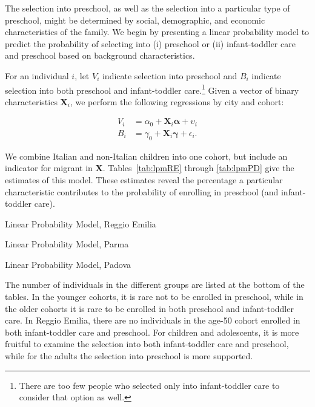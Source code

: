 The selection into preschool, as well as the selection into a particular type of preschool, might be determined by social, demographic, and economic characteristics of the family. We begin by presenting a linear probability model to predict the probability of selecting into (i) preschool or (ii) infant-toddler care and preschool based on background characteristics.

For an individual $i$, let $V_i$ indicate selection into preschool and $B_i$ indicate selection into both preschool and infant-toddler care.\footnote{There are too few people who selected only into infant-toddler care to consider that option as well.} Given a vector of binary characteristics $\mathbf{X}_i$, we perform the following regressions by city and cohort:

\begin{align}
	V_i &= \alpha_0 + \mathbf{X}_i\bm{\alpha} + \upsilon_i \label{eq:lpm-v} \\
	B_i &= \gamma_0 + \mathbf{X}_i\bm{\gamma} + \epsilon_i. \label{eq:lpm-b}
\end{align}

We combine Italian and non-Italian children into one cohort, but include an indicator for migrant in $\mathbf{X}$. Tables~\ref{tab:lpmRE} through \ref{tab:lpmPD} give the estimates of this model. These estimates reveal the percentage a particular characteristic contributes to the probability of enrolling in preschool (and infant-toddler care). 

\begin{table}
	\caption{Linear Probability Model, Reggio Emilia}\label{tab:lpmRE}
	\centering
	\footnotesize
		
\end{table}

\begin{table}
	\caption{Linear Probability Model, Parma}\label{tab:lpmPR}
	\centering
	\footnotesize
		
\end{table}

\begin{table}
	\caption{Linear Probability Model, Padova}\label{tab:lpmPD}
	\centering
	\footnotesize
		
\end{table}

The number of individuals in the different groups are listed at the bottom of the tables. In the younger cohorts, it is rare not to be enrolled in preschool, while in the older cohorts it is rare to be enrolled in both preschool and infant-toddler care. In Reggio Emilia, there are no individuals in the age-50 cohort enrolled in both infant-toddler care and preschool. For children and adolescents, it is more fruitful to examine the selection into both infant-toddler care and preschool, while for the adults the selection into preschool is more supported.

